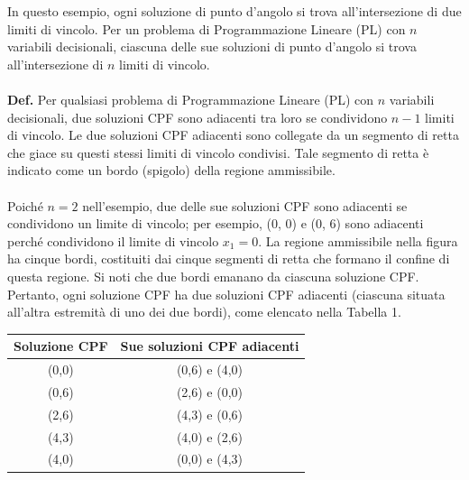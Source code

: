 \documentclass[a4paper, 11pt]{article}
\begin{document}
        In questo esempio, ogni soluzione di punto d'angolo si trova all'intersezione di due limiti di vincolo. Per un problema di Programmazione Lineare (PL) con $n$ variabili decisionali, ciascuna delle sue soluzioni di punto d'angolo si trova all'intersezione di $n$ limiti di vincolo.

        \paragraph{}

        \paragraph{}
        \textbf{Def. } Per qualsiasi problema di Programmazione Lineare (PL) con $n$ variabili decisionali, due soluzioni CPF sono adiacenti tra loro se condividono $n - 1$ limiti di vincolo. Le due soluzioni CPF adiacenti sono collegate da un segmento di retta che giace su questi stessi limiti di vincolo condivisi. Tale segmento di retta è indicato come un bordo (spigolo) della regione ammissibile.

        \paragraph{}
        Poiché $n = 2$ nell'esempio, due delle sue soluzioni CPF sono adiacenti se condividono un limite di vincolo; per esempio, (0, 0) e (0, 6) sono adiacenti perché condividono il limite di vincolo $x_1 = 0$. La regione ammissibile nella figura ha cinque bordi, costituiti dai cinque segmenti di retta che formano il confine di questa regione. Si noti che due bordi emanano da ciascuna soluzione CPF. Pertanto, ogni soluzione CPF ha due soluzioni CPF adiacenti (ciascuna situata all'altra estremità di uno dei due bordi), come elencato nella Tabella 1.

        \begin{center}
        \begin{tabular}{| c | c |}
            \hline
            Soluzione CPF & Sue soluzioni CPF adiacenti \\
            \hline
            (0,0) & (0,6) e (4,0) \\
            \hline
            (0,6) & (2,6) e (0,0) \\
            \hline
            (2,6) & (4,3) e (0,6) \\
            \hline
            (4,3) & (4,0) e (2,6) \\
            \hline
            (4,0) & (0,0) e (4,3) \\
            \hline
        \end{tabular}
        \end{center}
\end{document}
